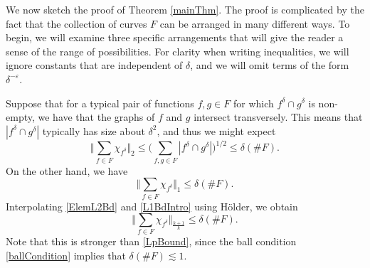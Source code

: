 \documentclass[letterpaper, reqno,11pt]{article}
\numberwithin{equation}{section}
\newcommand{\eps}{\varepsilon}
\numberwithin{thm}{section}
\theoremstyle{remark}
\begin{document}
\medskip


We now sketch the proof of Theorem \ref{mainThm}. The proof is complicated by the fact that the collection of curves $F$ can be arranged in many different ways. To begin, we will examine three specific arrangements that will give the reader a sense of the range of possibilities. For clarity when writing inequalities, we will ignore constants that are independent of $\delta$, and we will omit terms of the form $\delta^{-\eps}$. 

\medskip

 Suppose that for a typical pair of functions $f,g\in F$ for which $f^\delta\cap g^\delta$ is non-empty, we have that the graphs of $f$ and $g$ intersect transversely. This means that $|f^\delta\cap g^\delta|$ typically has size about $\delta^2$, and thus we might expect
\begin{equation}\label{ElemL2Bd}
\Big\Vert \sum_{f\in F} \chi_{f^\delta} \Big\Vert_2 \leq \Big(\sum_{f,g\in F}|f^\delta\cap g^\delta|\Big)^{1/2}\leq \delta (\#F).
\end{equation}
On the other hand, we have 
\begin{equation}\label{L1BdIntro}
\Big\Vert \sum_{f\in F} \chi_{f^\delta} \Big\Vert_1 \leq \delta(\#F).
\end{equation}
Interpolating \eqref{ElemL2Bd} and \eqref{L1BdIntro} using H\"older, we obtain
\begin{equation}\label{arrangement1Bd}
\Big\Vert \sum_{f\in F} \chi_{f^\delta} \Big\Vert_{\frac{k+1}{k}}\leq \delta(\#F).
\end{equation}
Note that this is stronger than \eqref{LpBound}, since the ball condition \eqref{ballCondition} implies that $\delta(\#F)\lesssim 1$.

\medskip
\end{document}
